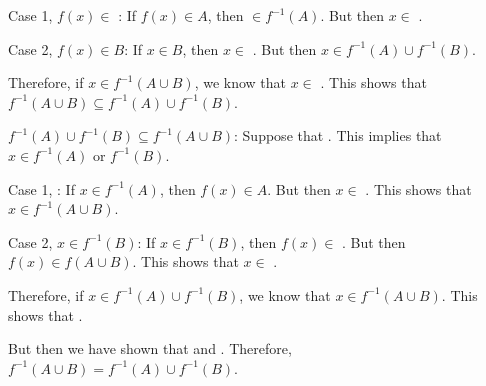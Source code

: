 \documentclass[11pt,letterpaper]{article}
\newcommand{\blank}[1]{\underline{\hspace{#1}}} %
\begin{document}
	\hspace{1cm} Case 1, $f(x) \in$ \blank{3cm}: If $f(x) \in A$, then \blank{3cm} $\in f^{-1}(A)$. But then \pspace \hspace{1cm} $x \in$ \blank{4cm}. \pvspace{1cm}

	\hspace{1cm} Case 2, $f(x) \in B$: If $x \in B$, then $x \in$ \blank{3cm}. But then $x \in f^{-1}(A) \cup f^{-1}(B)$. \pvspace{1cm}

Therefore, if $x \in f^{-1}(A \cup B)$, we know that $x \in$ \blank{5cm}. This shows \pspace that $f^{-1}(A \cup B) \subseteq f^{-1}(A) \cup f^{-1}(B)$. 


$f^{-1}(A) \cup f^{-1}(B) \subseteq f^{-1}(A \cup B)$: Suppose that \blank{5cm}. This implies \pspace that $x \in f^{-1}(A)$ or $f^{-1}(B)$. \pspace

	\hspace{1cm} Case 1, \blank{3cm}: If $x \in f^{-1}(A)$, then $f(x) \in A$. But then $x \in$ \blank{3cm}. \pspace \hspace{1cm} This shows that $x \in f^{-1}(A \cup B)$. \pvspace{1cm}

	\hspace{1cm} Case 2, $x \in f^{-1}(B)$: If $x \in f^{-1}(B)$, then $f(x) \in$ \blank{3cm}. But then $f(x) \in f(A \cup B)$. \pspace \hspace{1cm} This shows that $x \in$ \blank{3cm}. 

Therefore, if $x \in f^{-1}(A) \cup f^{-1}(B)$, we know that $x \in f^{-1}(A \cup B)$. This shows that \blank{4cm}. 


But then we have shown that \blank{4cm} and \blank{4cm}. Therefore, \pspace $f^{-1}(A \cup B)= f^{-1}(A) \cup f^{-1}(B)$. 
\end{document}

